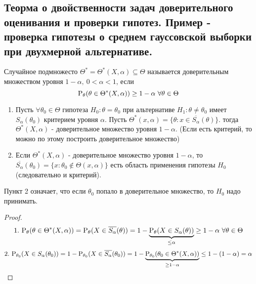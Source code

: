 \subsection{Теорма о двойственности задач доверительного оценивания
и проверки гипотез. Пример - проверка гипотезы о среднем гауссовской выборки
при двухмерной альтернативе.}

\begin{definition}
    Случайное подмножесто \(\Theta^*=\Theta^*(X,\alpha)\subseteq\Theta\)
    называется доверительным множеством уровня \(1-\alpha,\ 0<\alpha<1\),
    если
    \[\P_\theta(\theta\in\Theta^*(X,\alpha))\geq 1-\alpha\ \forall\theta\in\Theta\]
\end{definition}
\begin{theorem} \label{th::trusted_set_eq_plausibility_test}
    \begin{enumerate}
        \item Пусть \(\forall\theta_0\in\Theta\) гипотеза \(H_0:\theta=\theta_0\)
        при альтернативе \(H_1:\theta\neq\theta_0\) имеет \(S_\alpha(\theta_0)\)
        критерием уровня \(\alpha\). Пусть \(\Theta^*(x,\alpha) = \{\theta:x\in\overline{S_\alpha}(\theta)\}\).
        тогда \(\Theta^*(X,\alpha)\) - доверительное множество уровня \(1-\alpha\).
        (Если есть критерий, то можно по этому  построить доверительное множество)

        \item Если \(\Theta^*(X,\alpha)\) - доверительное множество уровня \(1-\alpha\),
        то \(\overline{S_\alpha}(\theta_0)=\{x:\theta_0\notin\Theta(x,\alpha)\}\)
        есть область применения гипотезы \(H_0\) (следовательно и критерий).
    \end{enumerate}
\end{theorem}
\begin{remark} \label{hyp::accept_HO}
    Пункт 2 означает, что если \(\theta_0\) попало в доверительное множество,
    то \(H_0\) надо принимать.
\end{remark}
\begin{proof}
    \[1.\ \P_\theta(\theta\in\Theta^*(X,\alpha)) = \P_\theta(X\in\overline{S_\alpha}(\theta)) = 1 - \underbrace{\P_\theta(X\in S_\alpha(\theta))}_{\leq\alpha}\geq 1-\alpha\ \forall\theta\in\Theta\]
    \[2.\ \P_{\theta_0}(X\in S_\alpha(\theta_0)) = 1-\P_{\theta_0}(X\in \overline{S_\alpha}(\theta_0))=
        1-\underbrace{\P_{\theta_0}(\theta_0\in\Theta^*(X,\alpha))}_{\geq 1-\alpha} \leq 1-(1-\alpha) = \alpha\]
\end{proof}
